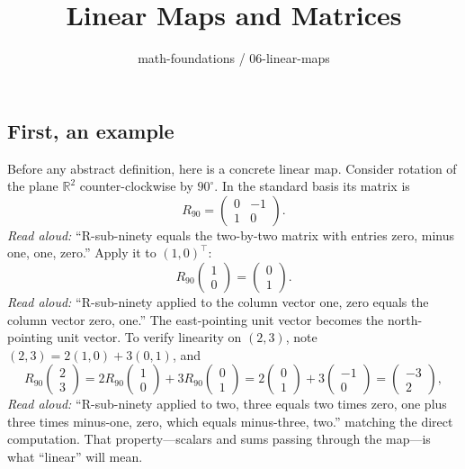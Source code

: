 \documentclass[11pt]{article}
\title{Linear Maps and Matrices}
\author{math-foundations / 06-linear-maps}
\date{}
\theoremstyle{plain}
\theoremstyle{definition}
\begin{document}
\maketitle

\subsection*{First, an example}
Before any abstract definition, here is a concrete linear map. Consider rotation
of the plane $\mathbb{R}^2$ counter-clockwise by $90^\circ$. In the standard
basis its matrix is
\[
R_{90} = \begin{pmatrix} 0 & -1 \\ 1 & 0 \end{pmatrix}.
\]
\emph{Read aloud:} ``R-sub-ninety equals the two-by-two matrix with entries zero, minus one, one, zero.''
Apply it to $(1, 0)^\top$:
\[
R_{90} \begin{pmatrix} 1 \\ 0 \end{pmatrix}
= \begin{pmatrix} 0 \\ 1 \end{pmatrix}.
\]
\emph{Read aloud:} ``R-sub-ninety applied to the column vector one, zero equals the column vector zero, one.''
The east-pointing unit vector becomes the north-pointing unit vector. To verify
linearity on $(2, 3)$, note $(2,3) = 2(1,0) + 3(0,1)$, and
\[
R_{90}\begin{pmatrix} 2 \\ 3 \end{pmatrix}
= 2 R_{90}\begin{pmatrix} 1 \\ 0 \end{pmatrix} + 3 R_{90}\begin{pmatrix} 0 \\ 1 \end{pmatrix}
= 2\begin{pmatrix} 0 \\ 1 \end{pmatrix} + 3\begin{pmatrix} -1 \\ 0 \end{pmatrix}
= \begin{pmatrix} -3 \\ 2 \end{pmatrix},
\]
\emph{Read aloud:} ``R-sub-ninety applied to two, three equals two times zero, one plus three times minus-one, zero, which equals minus-three, two.''
matching the direct computation. That property---scalars and sums passing
through the map---is what ``linear'' will mean.
\end{document}
